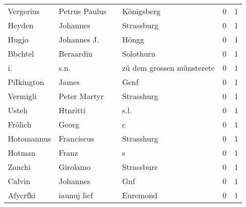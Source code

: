 \begin{center}
\begin{tiny}
\begin{longtabu}{llllrr}
                Vergerius &                      Petrus Paulus &             &                                  Königsberg &          0 &         1 \\
                   Heyden &                           Johannes &             &                                  Strassburg &          0 &         1 \\
                    Hugjo &                        Johannes J. &             &                                       Höngg &          0 &         1 \\
                  Bbchtel &                          Beraardin &             &                                   Solothurn &          0 &         1 \\
                       i. &                               s.n. &             &                   zü dem grossen münsteretc &          0 &         1 \\
               PiIkington &                              James &             &                                        Genf &          0 &         1 \\
                 Vermigli &                       Peter Martyr &             &                                  Strasshurg &          0 &         1 \\
                    Usteh &                           Htnritti &             &                                        s.l. &          0 &         1 \\
                  Frölich &                              Georg &             &                                           c &          0 &         1 \\
               Hotomannus &                         Franciscus &             &                                  Strasshurg &          0 &         1 \\
                   Hotman &                              Franz &             &                                           s &          0 &         1 \\
                   Zanchi &                           Girolamo &             &                                  Strassbure &          0 &         1 \\
                   Calvin &                           Johannes &             &                                         Gnf &          0 &         1 \\
                 Afycrfki &                        iaunuj licf &             &                                    Euremond &          0 &         1 \\

\end{longtabu}
\end{tiny}
\end{center}
